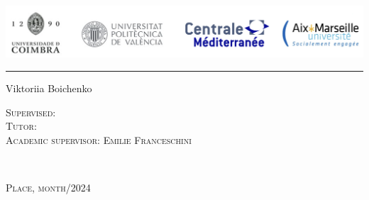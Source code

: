 \documentclass[11pt]{article}
\begin{document}
\thispagestyle{empty}
\begin{minipage}{0.96\linewidth}
\includegraphics[width=1\linewidth]{figures/universities.png}
\end{minipage}
\vspace{20pt}
\hrule
\vspace{5pt}

\begin{center}
\vfill
{
\LARGE{}

\vspace{0.5cm}
\Large
{}}   


\vfill
 
\Large{Viktoriia Boichenko}
 
\vfill

\LARGE{}

\LARGE{}

\Large
{}

\end{center}

\vfill

\begin{minipage}[t]{0.5\linewidth}
    \textsc{Supervised:} \medskip\\
    \textsc{Tutor:} \medskip\\
    \textsc{Academic supervisor: Emilie Franceschini} \medskip\\
\end{minipage}
\begin{minipage}[t]{0.5\linewidth}
\end{minipage}

\vfill

\begin{minipage}[t]{0.5\linewidth}
    \textsc{} \medskip\\
\end{minipage}
\begin{minipage}[t]{0.5\linewidth}
    \large\textsc{Place, month/2024}\medskip\\
\end{minipage}

%     
\end{document}
